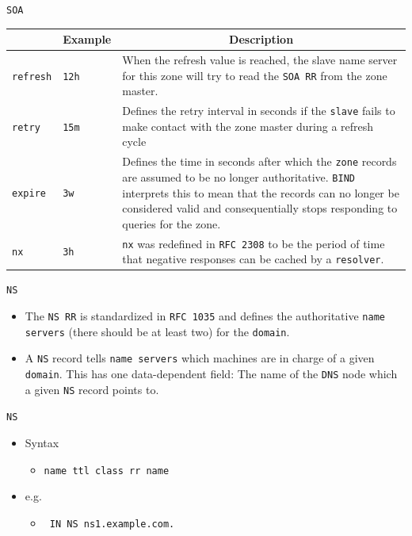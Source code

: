 \documentclass[aspectratio=169,xcolor=table]{beamer}
\begin{document}
\begin{frame}{\texttt{SOA}}
  \begin{table}
    \tiny
    \begin{tabular}{|p{1.6cm}|p{1.6cm}|p{5.7cm}|} 
      \hline
      \rowcolor{gray}
      \multicolumn{1}{|c|}{Syntax} & \multicolumn{1}{c|}{Example} & \multicolumn{1}{c|}{Description}\\ 
      \hline
      \texttt{refresh}&\texttt{12h}&When the refresh value is reached, the slave name server for this zone will try to read the \texttt{SOA RR} from the zone master.\\
      \hline
      \texttt{retry}&\texttt{15m}&Defines the retry interval in seconds if the \texttt{slave} fails to make contact with the zone master during a refresh cycle\\
      \hline
      \texttt{expire}&\texttt{3w}&Defines the time in seconds after which the \texttt{zone} records are assumed to be no longer authoritative. \texttt{BIND} interprets this to mean that the records can no longer be considered valid and consequentially stops responding to queries for the zone.\\
      \hline
      \texttt{nx}&\texttt{3h}&\texttt{nx} was redefined in \texttt{RFC 2308} to be the period of time that negative responses can be cached by a \texttt{resolver}.\\
      \hline
    \end{tabular}
  \end{table}
\end{frame}

\begin{frame}{\texttt{NS}}
  \begin{itemize}
      \item The \texttt{NS RR} is standardized in \texttt{RFC 1035} and defines the authoritative \texttt{name servers} (there should be at least two) for the \texttt{domain}.
      \item A \texttt{NS} record tells \texttt{name servers} which machines are in charge of a given \texttt{domain}. This has one data-dependent field: The name of the \texttt{DNS} node which a given \texttt{NS} record points to. 
  \end{itemize}
\end{frame}

\begin{frame}{\texttt{NS}}
  \begin{itemize}
    \item Syntax
      \begin{itemize}
        \item \texttt{name ttl class rr name}
      \end{itemize}
    \item e.g.
      \begin{itemize}
        \item \texttt{ IN NS ns1.example.com.}
      \end{itemize}
  \end{itemize}
\end{frame}
\end{document}
